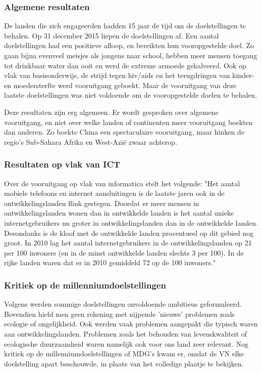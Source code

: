 \subsubsection{Algemene resultaten}
De landen die zich engageerden hadden 15 jaar de tijd om de doelstellingen te behalen. Op 31 december 2015 liepen de doelstellingen af.
Een aantal doelstellingen had een positieve afloop, en bereikten hun vooropgestelde doel. Zo gaan bijna evenveel meisjes als jongens naar school, hebben meer mensen toegang tot drinkbaar water dan ooit en werd de extreme armoede gehalveerd. Ook op vlak van basisonderwijs, de strijd tegen hiv/aids en het terugdringen van kinder- en moedersterfte werd vooruitgang geboekt. Maar de vooruitgang van deze laatste doelstellingen was niet voldoende om de vooropgestelde doelen te behalen. \autocite{Tierens2014}

Deze resultaten zijn erg algemeen. Er wordt gesproken over algemene vooruitgang, en niet over welke landen of continenten meer vooruitgang boekten dan anderen. Zo boekte China een spectaculaire vooruitgang, maar hinken de regio's Sub-Sahara Afrika en West-Azië zwaar achterop. \autocite{Tierens2014}
 
 \subsubsection{Resultaten op vlak van ICT}
Over de vooruitgang op vlak van informatica stelt \autocite{Kampherbeek2012} het volgende: "Het aantal mobiele telefoons en internet aansluitingen is de laatste jaren ook in de ontwikkelingslanden flink gestegen. Doordat er meer mensen in ontwikkelingslanden wonen dan in ontwikkelde landen is het aantal unieke internetgebruikers nu groter in ontwikkelingslanden dan in de ontwikkelde landen. Desondanks is de kloof met de ontwikkelde landen procentueel op dit gebied nog groot. In 2010 lag het aantal internetgebruikers in de ontwikkelingslanden op 21 per 100 inwoners (en in de minst ontwikkelde landen slechts 3 per 100). In de rijke landen waren dat er in 2010 gemiddeld 72 op de 100 inwoners."
 
 \subsubsection{Kritiek op de millenniumdoelstellingen}
 Volgens  \autocite{VN2015} werden sommige doelstellingen onvoldoende ambitieus geformuleerd. Bovendien hield men geen rekening met nijpende 'nieuwe' problemen zoals ecologie of ongelijkheid. Ook werden vaak problemen aangepakt die typisch waren aan ontwikkelingslanden. Problemen zoals het behouden van levenskwaliteit of ecologische duurzaamheid waren namelijk ook voor ons land zeer relevant. Nog kritiek op de millenniumdoelstellingen of MDG's kwam er, omdat de VN elke doelstelling apart beschouwde, in plaats van het volledige plaatje te bekijken. \autocite{VN2015}

